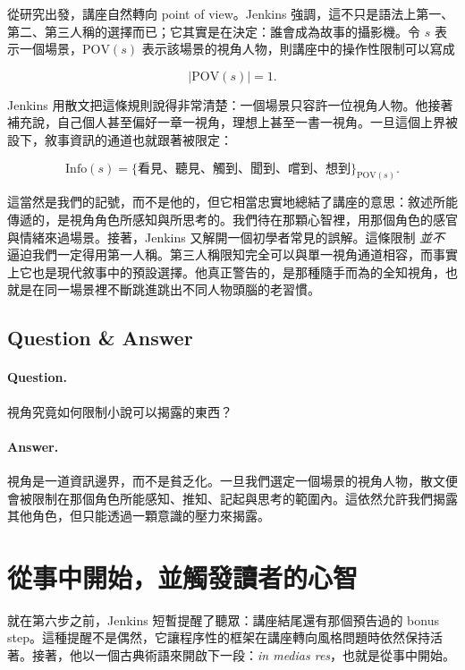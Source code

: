 從研究出發，講座自然轉向 point of view。Jenkins 強調，這不只是語法上第一、第二、第三人稱的選擇而已；它其實是在決定：誰會成為故事的攝影機。令 \(s\) 表示一個場景，\(\mathrm{POV}(s)\) 表示該場景的視角人物，則講座中的操作性限制可以寫成

\begin{equation}
|\mathrm{POV}(s)|=1.
\end{equation}

Jenkins 用散文把這條規則說得非常清楚：一個場景只容許一位視角人物。他接著補充說，自己個人甚至偏好一章一視角，理想上甚至一書一視角。一旦這個上界被設下，敘事資訊的通道也就跟著被限定：

\begin{equation}
\mathrm{Info}(s)=\{\text{看見、聽見、觸到、聞到、嚐到、想到}\}_{\mathrm{POV}(s)}.
\end{equation}

這當然是我們的記號，而不是他的，但它相當忠實地總結了講座的意思：敘述所能傳遞的，是視角角色所感知與所思考的。我們待在那顆心智裡，用那個角色的感官與情緒來過場景。接著，Jenkins 又解開一個初學者常見的誤解。這條限制 \emph{並不} 逼迫我們一定得用第一人稱。第三人稱限知完全可以與單一視角通道相容，而事實上它也是現代敘事中的預設選擇。他真正警告的，是那種隨手而為的全知視角，也就是在同一場景裡不斷跳進跳出不同人物頭腦的老習慣。

\subsection{Question \& Answer}

\paragraph{Question.} 視角究竟如何限制小說可以揭露的東西？

\paragraph{Answer.} 視角是一道資訊邊界，而不是貧乏化。一旦我們選定一個場景的視角人物，散文便會被限制在那個角色所能感知、推知、記起與思考的範圍內。這依然允許我們揭露其他角色，但只能透過一顆意識的壓力來揭露。

\section{從事中開始，並觸發讀者的心智}

就在第六步之前，Jenkins 短暫提醒了聽眾：講座結尾還有那個預告過的 bonus step。這種提醒不是偶然，它讓程序性的框架在講座轉向風格問題時依然保持活著。接著，他以一個古典術語來開啟下一段：\emph{in medias res}，也就是從事中開始。

